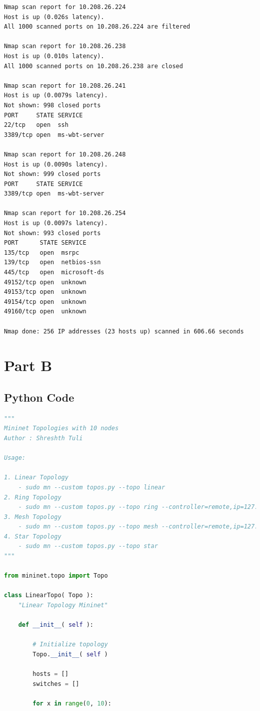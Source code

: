 \documentclass[a4paper, 11pt]{article}
\begin{document}
\begin{appendices}
\begin{lstlisting}[style=BashInputStyle]
Nmap scan report for 10.208.26.224
Host is up (0.026s latency).
All 1000 scanned ports on 10.208.26.224 are filtered

Nmap scan report for 10.208.26.238
Host is up (0.010s latency).
All 1000 scanned ports on 10.208.26.238 are closed

Nmap scan report for 10.208.26.241
Host is up (0.0079s latency).
Not shown: 998 closed ports
PORT     STATE SERVICE
22/tcp   open  ssh
3389/tcp open  ms-wbt-server

Nmap scan report for 10.208.26.248
Host is up (0.0090s latency).
Not shown: 999 closed ports
PORT     STATE SERVICE
3389/tcp open  ms-wbt-server

Nmap scan report for 10.208.26.254
Host is up (0.0097s latency).
Not shown: 993 closed ports
PORT      STATE SERVICE
135/tcp   open  msrpc
139/tcp   open  netbios-ssn
445/tcp   open  microsoft-ds
49152/tcp open  unknown
49153/tcp open  unknown
49154/tcp open  unknown
49160/tcp open  unknown

Nmap done: 256 IP addresses (23 hosts up) scanned in 606.66 seconds
\end{lstlisting}

\section{Part B}
\subsection{Python Code}
\label{appendix:python}
\begin{lstlisting}[language=python]
"""
Mininet Topologies with 10 nodes 
Author : Shreshth Tuli

Usage:

1. Linear Topology
    - sudo mn --custom topos.py --topo linear
2. Ring Topology
    - sudo mn --custom topos.py --topo ring --controller=remote,ip=127.0.0.1
3. Mesh Topology
    - sudo mn --custom topos.py --topo mesh --controller=remote,ip=127.0.0.1
4. Star Topology
    - sudo mn --custom topos.py --topo star
"""

from mininet.topo import Topo

class LinearTopo( Topo ):
    "Linear Topology Mininet"

    def __init__( self ):

        # Initialize topology
        Topo.__init__( self )

        hosts = []
        switches = []

        for x in range(0, 10):


\end{lstlisting}
\end{appendices}
\end{document}
